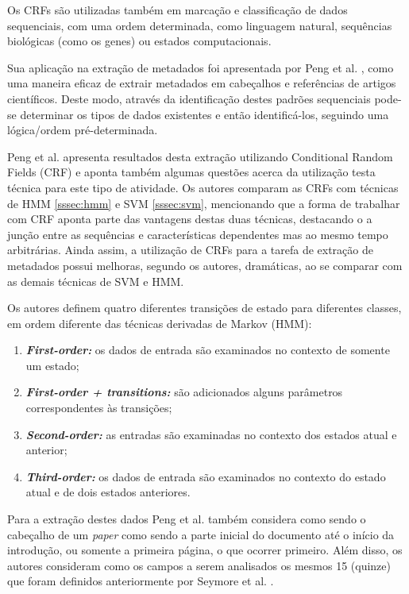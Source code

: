 Os CRFs são utilizadas também em marcação e classificação de dados sequenciais, com uma ordem determinada, como linguagem natural, sequências biológicas (como os genes) ou estados computacionais.


Sua aplicação na extração de metadados foi apresentada por Peng et al. \cite{Peng-CRF-IE}, como uma maneira eficaz de extrair metadados em cabeçalhos e referências de artigos científicos. Deste modo, através da identificação destes padrões sequenciais pode-se determinar os tipos de dados existentes e então identificá-los, seguindo uma lógica/ordem pré-determinada.

\begin{textnew}
Peng et al. apresenta resultados desta extração utilizando Conditional Random Fields (CRF) e aponta também algumas questões acerca da utilização testa técnica para este tipo de atividade. Os autores comparam as CRFs com técnicas de HMM \autoref{sssec:hmm} e SVM \autoref{sssec:svm}, mencionando que a forma de trabalhar com CRF aponta parte das vantagens destas duas técnicas, destacando o a junção entre as sequências e características dependentes mas ao mesmo tempo arbitrárias. Ainda assim, a utilização de CRFs para a tarefa de extração de metadados possui melhoras, segundo os autores, dramáticas, ao se comparar com as demais técnicas de SVM e HMM.

Os autores definem quatro diferentes transições de estado para diferentes classes, em ordem diferente das técnicas derivadas de Markov (HMM):

\begin{enumerate}
    \item \emph{\textbf{First-order:}} os dados de entrada são examinados no contexto de somente um estado;
    \item \emph{\textbf{First-order + transitions:}} são adicionados alguns parâmetros correspondentes às transições;
    \item \emph{\textbf{Second-order:}} as entradas são examinadas no contexto dos estados atual e anterior;
    \item \emph{\textbf{Third-order:}} os dados de entrada são examinados no contexto do estado atual e de dois estados anteriores.
\end{enumerate}

Para a extração destes dados Peng et al. também considera como sendo o cabeçalho de um \emph{paper} como sendo a parte inicial do documento até o início da introdução, ou somente a primeira página, o que ocorrer primeiro. Além disso, os autores consideram como os campos a serem analisados os mesmos 15 (quinze) que foram definidos anteriormente por Seymore et al. \cite{Seymore-HMM-IE}.


\end{textnew}
